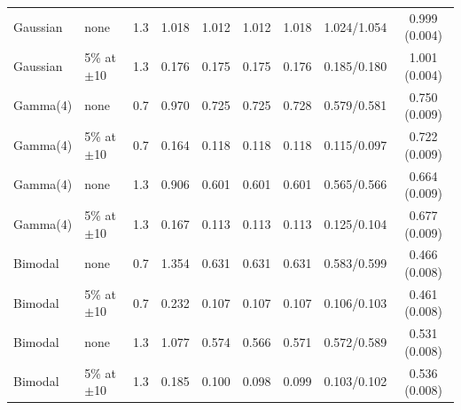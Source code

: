 \begin{tabular}{llccccccc}
Gaussian & none & 1.3 & 1.018 & 1.012 & 1.012 & 1.018 & 1.024/1.054 & 0.999 (0.004) \\
Gaussian & 5\% at $\pm$10 & 1.3 & 0.176 & 0.175 & 0.175 & 0.176 & 0.185/0.180 & 1.001 (0.004) \\
Gamma(4) & none & 0.7 & 0.970 & 0.725 & 0.725 & 0.728 & 0.579/0.581 & 0.750 (0.009) \\
Gamma(4) & 5\% at $\pm$10 & 0.7 & 0.164 & 0.118 & 0.118 & 0.118 & 0.115/0.097 & 0.722 (0.009) \\
Gamma(4) & none & 1.3 & 0.906 & 0.601 & 0.601 & 0.601 & 0.565/0.566 & 0.664 (0.009) \\
Gamma(4) & 5\% at $\pm$10 & 1.3 & 0.167 & 0.113 & 0.113 & 0.113 & 0.125/0.104 & 0.677 (0.009) \\
Bimodal & none & 0.7 & 1.354 & 0.631 & 0.631 & 0.631 & 0.583/0.599 & 0.466 (0.008) \\
Bimodal & 5\% at $\pm$10 & 0.7 & 0.232 & 0.107 & 0.107 & 0.107 & 0.106/0.103 & 0.461 (0.008) \\
Bimodal & none & 1.3 & 1.077 & 0.574 & 0.566 & 0.571 & 0.572/0.589 & 0.531 (0.008) \\
Bimodal & 5\% at $\pm$10 & 1.3 & 0.185 & 0.100 & 0.098 & 0.099 & 0.103/0.102 & 0.536 (0.008) \\
\bottomrule
\end{tabular}
